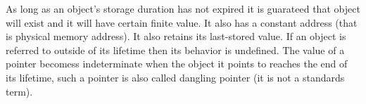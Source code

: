 As long as an object's storage duration has not expired it is
guarateed that object will exist and it will have certain finite
value. It also has a constant address (that is physical memory
address). It also retains its last-stored value. If an object is
referred to outside of its lifetime then its behavior is
undefined. The value of a pointer becomess indeterminate when the
object it points to reaches the end of its lifetime, such a pointer is
also called dangling pointer (it is not a standards term).
